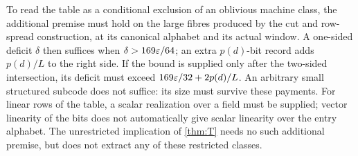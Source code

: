 To read the table as a conditional exclusion of an oblivious machine class, the additional premise must hold on the
large fibres produced by the cut and row-spread construction, at its canonical alphabet and its actual window.
A one-sided deficit $\delta$ then suffices when $\delta>169\varepsilon/64$; an extra $p(d)$-bit record adds $p(d)/L$ to the
right side. If the bound is supplied only after the two-sided intersection, its deficit must exceed
$169\varepsilon/32+2p(d)/L$. An arbitrary small structured subcode does not suffice: its size must survive these payments.
For linear rows of the table, a scalar realization over a field must be supplied; vector linearity of the bits does
not automatically give scalar linearity over the entry alphabet. The unrestricted implication of \cref{thm:T}
needs no such additional premise, but does not extract any of these restricted classes.
